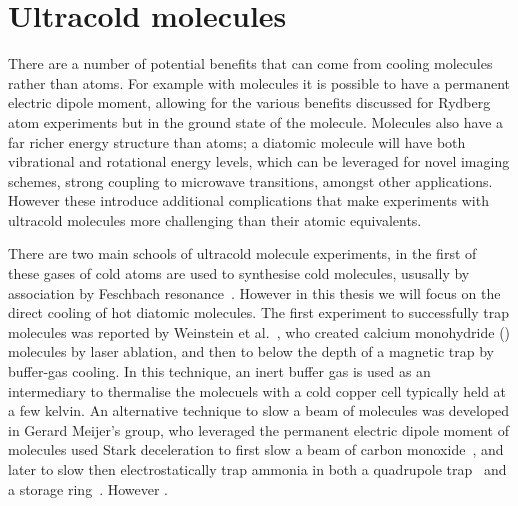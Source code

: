 
\section{Ultracold molecules}

There are a number of potential benefits that can come from cooling molecules
rather than atoms. For example with molecules it is possible to have a
permanent electric dipole moment, allowing for the various benefits discussed
for Rydberg atom experiments but in the ground state of the molecule.
%
%
Molecules also have a far richer energy structure than atoms; a diatomic
molecule will have both vibrational and rotational energy levels, which can be
leveraged for novel imaging schemes, strong coupling to microwave transitions,
amongst other applications. However these introduce additional complications
that make experiments with ultracold molecules more challenging than their
atomic equivalents.

There are two main schools of ultracold molecule experiments, in the first of
these gases of cold atoms are used to synthesise cold molecules, ususally by
association by Feschbach resonance~\cite{Moses2017,PhysRevA.89.033604}. However
in this thesis we will focus on the direct cooling of hot diatomic molecules.
The first experiment to successfully trap molecules was reported by Weinstein
et al.~\cite{Weinstein1998}, who created calcium monohydride (\CaH{}) molecules
by laser ablation, and then to below the depth of a magnetic trap by buffer-gas
cooling. In this technique, an inert buffer gas is used as an intermediary to
thermalise the molecuels with a cold copper cell typically held at a few
kelvin.
%
An alternative technique to slow a beam of molecules was developed in Gerard
Meijer's group, who leveraged the permanent electric dipole moment of molecules
used Stark deceleration to first slow a beam of carbon
monoxide~\cite{Bethlem1999}, and later to slow then electrostatically trap
ammonia in both a quadrupole trap~\cite{Bethlem2000} and a storage
ring~\cite{Crompvoets2001, Crompvoets2005}.  However .


